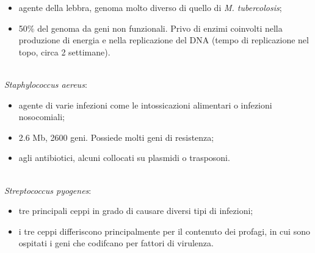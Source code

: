 \begin{itemize}
    \item agente della lebbra, genoma molto diverso di quello di \textit{M. tubercolosis};
    \item 50$\%$ del genoma da geni non funzionali. Privo di enzimi coinvolti nella produzione di energia e nella replicazione del DNA (tempo di replicazione nel topo, circa 2 settimane).
\end{itemize}
\\\textit{Staphylococcus aereus}:
\begin{itemize}
    \item agente di varie infezioni come le intossicazioni alimentari o infezioni nosocomiali; 
    \item 2.6 Mb, 2600 geni. Possiede molti geni di resistenza; 
    \item agli antibiotici, alcuni collocati su plasmidi o trasposoni.
\end{itemize}
\\\textit{Streptococcus pyogenes}:
\begin{itemize}
    \item tre principali ceppi in grado di causare diversi tipi di infezioni; 
    \item i tre ceppi differiscono principalmente per il contenuto dei profagi, in cui sono ospitati i geni che codifcano per fattori di virulenza.
\end{itemize}
